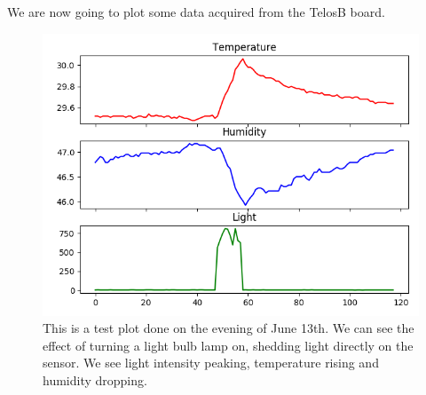 \documentclass[11pt]{article}
\begin{document}
We are now going to plot some data acquired from the TelosB board.

\begin{figure}[h]
\includegraphics[width=\textwidth]{lamp}
\caption{This is a test plot done on the evening of June 13th. We can see the effect of turning a light bulb lamp on, shedding light directly on the sensor. We see light intensity peaking, temperature rising and humidity dropping.}
\end{figure}
\end{document}
